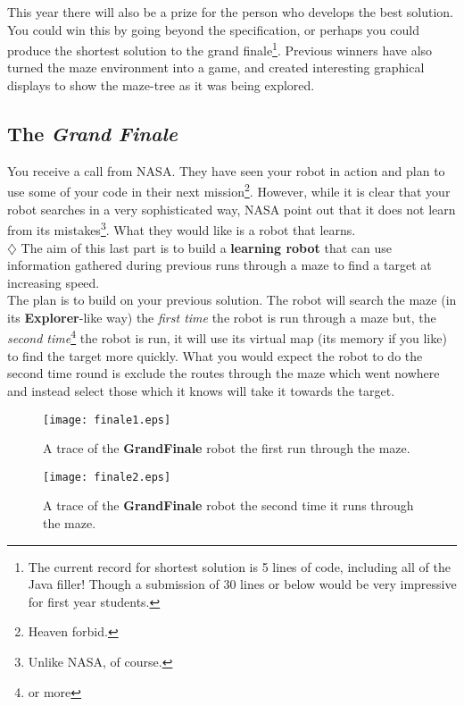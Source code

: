 \noindent
This year there will also be a prize for the person who develops the 
best solution. You could win this by going beyond the specification, or
perhaps you could produce the shortest solution to the grand finale\footnote{The current
record for shortest solution is 5 lines of code, including all of the Java filler! Though a submission
of 30 lines or below would be very impressive for first year students.}. Previous
winners have also turned the maze environment into a game, and created interesting 
graphical displays to show the maze-tree as it was being explored.

\subsection{The {\it Grand Finale}}

You receive a call from NASA. They have seen your robot in action and plan 
to use some of your code in their next mission\footnote{Heaven forbid.}. 
However, while it is clear that your robot searches in a very sophisticated 
way, NASA point out that it does not learn from its mistakes\footnote{Unlike
NASA, of course.}. What they would like is a robot that learns. \\

\noindent
$\diamondsuit$ The aim of this last part is to build a {\bf learning robot} that can use 
information gathered during previous runs through a maze to find a target at 
increasing speed. \\

\noindent
The plan is to build on your previous solution. The robot will
search the maze (in its {\bf Explorer}-like way) the {\em first time} 
the robot is run through a maze but, 
the {\em second time}\footnote{or more} the robot is run, it will use its 
virtual map (its memory if you like) to find the target more quickly.
What you would expect the robot to do the second time round is exclude the 
routes through the maze which went nowhere and instead select those which
it knows will take it towards the target. \\

\begin{figure}[t]
\centering
\texttt{[image: finale1.eps]}
\caption{A trace of the {\bf GrandFinale} robot the first run through the 
maze.
\label{finale1}}
\end{figure}    

\begin{figure}[t]
\centering
\texttt{[image: finale2.eps]}
\caption{A trace of the {\bf GrandFinale} robot the second time it 
runs through the maze.
\label{finale2}}
\end{figure}    

